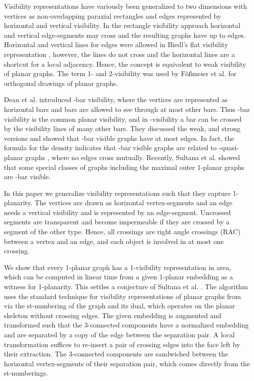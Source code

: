 \documentclass[runningheads]{llncs}
\begin{document}
Visibility representations have variously been generalized to two
dimensions
  with vertices  as non-overlapping paraxial rectangles
  and edges represented by  horizontal and  vertical
visibility. In the rectangle visibility approach
\cite{dh-rvrbg-94,hsv-orstt-95,hsv-rstg-99} horizontal and vertical
  edge-segments may cross and the resulting graphs have up
to  edges. Horizontal and vertical lines for edges were
allowed in   Biedl's flat visibility representation
\cite{b-sdogs-11}, however, the lines do not cross and the
horizontal lines are a shortcut for a local adjacency. Hence, the
concept is equivalent to weak visibility of planar graphs. The term
1- and 2-visibility was used by F\"{o}{\ss}meier et al.
\cite{fkk-2vdpg-96} for orthogonal drawings of planar graphs.

Dean et al. \cite{DEGLST-bkvg-07} introduced -bar visibility,
where the vertices are represented as horizontal bars and bars are
allowed to see through at most   other bars. Thus -bar
visibility is the common planar visibility, and  in -visibility a
bar can be crossed by the visibility lines of many other bars. They
discussed the weak,  and strong versions and showed that
-bar visible graphs have at most  edges. In fact, the
formula for the density indicates that -bar visible graphs are
related to -quasi-planar graphs \cite{s-kqpg-12,FPS-nekqpg-13},
where no  edges cross mutually. Recently,
 Sultana et al. \cite{srrt-b1vd1-13} showed that some special
 classes of graphs including the maximal outer 1-planar graphs
 are -bar visible.


In this paper we generalize visibility representations such that
 they capture 1-planarity. The vertices are drawn as horizontal
 vertex-segments
 and an edge needs a vertical visibility and is represented by an edge-segment.
 Uncrossed segments
 are transparent and become impermeable if they are crossed by a segment of the other type.
  Hence, all crossings are right angle crossings (RAC) between a vertex
 and an edge, and each object is involved in at most one crossing.



 We show that every 1-planar graph has a 1-visibility
 representation in  area, which can be computed in
 linear time from a given 1-planar embedding as a witness for
 1-planarity. This settles a conjecture of Sultana et al.
 \cite{srrt-b1vd1-13}.
 The algorithm uses the standard technique for visibility
 representations of planar graphs from \cite{dett-gdavg-99,rt-rplbopg-86, TT-vrpg-86}
 via the st-numbering
 of the graph and its dual, which operates on the planar skeleton without crossing edges.
  The given embedding is augmented  and transformed such
 that the 3-connected components have a
 normalized embedding \cite{abk-sld3c-13} and are separated by a
 copy of the edge between the separation pair. A local transformation
suffices to re-insert a pair  of crossing edges into the  face left
by their extraction. The
 3-connected components  are sandwiched between the horizontal
 vertex-segments of their separation pair, which comes directly from the st-numberings.
\end{document}
